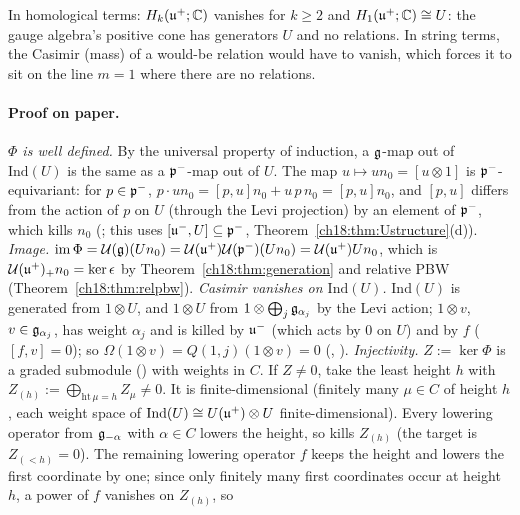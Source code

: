 \begin{physics}
In homological terms: $H_k(\mathfrak{u}^+;\mathbb C)$ vanishes for $k\ge2$ and $H_1(\mathfrak{u}^+;\mathbb C)\cong U$: the gauge algebra's positive cone has generators
$U$ and no relations.  In string terms, the Casimir (mass) of a would-be relation would have to vanish, which forces it to sit on the
line $m=1$ where there are no relations.
\end{physics}
\paragraph{Proof on paper.}  \emph{$\Phi$ is well defined.}  By the universal property of induction, a $\mathfrak{g}$-map out of
$\mathrm{Ind}(U)$ is the same as a $\mathfrak{p}^-$-map out of $U$.  The map $u\mapsto un_0=[u\otimes1]$ is $\mathfrak{p}^-$-equivariant: for $p\in\mathfrak{p}^-$,
$p\cdot un_0=[p,u]n_0+u\,p\,n_0=[p,u]n_0$, and $[p,u]$ differs from the action of $p$ on $U$ (through the Levi projection) by an element
of $\mathfrak{p}^-$, which kills $n_0$ (; this uses $[\mathfrak{u}^-,U]\subseteq\mathfrak{p}^-$, Theorem~\ref{ch18:thm:Ustructure}(d)).
\emph{Image.}  $\mathrm{im}\,\Phi=\mathcal U(\mathfrak{g})(Un_0)=\mathcal U(\mathfrak{u}^+)\mathcal U(\mathfrak{p}^-)(Un_0)=\mathcal U(\mathfrak{u}^+)Un_0$, which is
$\mathcal U(\mathfrak{u}^+)_+n_0=\ker\epsilon$ by Theorem~\ref{ch18:thm:generation} and relative PBW (Theorem~\ref{ch18:thm:relpbw}).
\emph{Casimir vanishes on $\mathrm{Ind}(U)$.}  $\mathrm{Ind}(U)$ is generated from $1\otimes U$, and $1\otimes U$ from $1\otimes\bigoplus_j\mathfrak{g}_{\alpha_j}$ by the Levi
action; $1\otimes v$, $v\in\mathfrak{g}_{\alpha_j}$, has weight $\alpha_j$ and is killed by $\mathfrak{u}^-$ (which acts by $0$ on $U$) and by $f$
($[f,v]=0$); so $\Omega(1\otimes v)=Q(1,j)(1\otimes v)=0$ (, ).
\emph{Injectivity.}  $Z:=\ker\Phi$ is a graded submodule () with weights in $C$.  If $Z\neq0$,
take the least height $h$ with $Z_{(h)}:=\bigoplus_{\mathrm{ht}\,\mu=h}Z_\mu\ne0$.  It is finite-dimensional (finitely many $\mu\in C$ of height $h$,
each weight space of $\mathrm{Ind}(U)\cong\mathcal \mathcal U(\mathfrak{u}^+)\otimes U$ finite-dimensional).  Every lowering operator from $\mathfrak{g}_{-\alpha}$ with $\alpha\in C$ lowers
the height, so kills $Z_{(h)}$ (the target is $Z_{(<h)}=0$).  The remaining lowering operator $f$ keeps the height and lowers the first
coordinate by one; since only finitely many first coordinates occur at height $h$, a power of $f$ vanishes on $Z_{(h)}$, so

